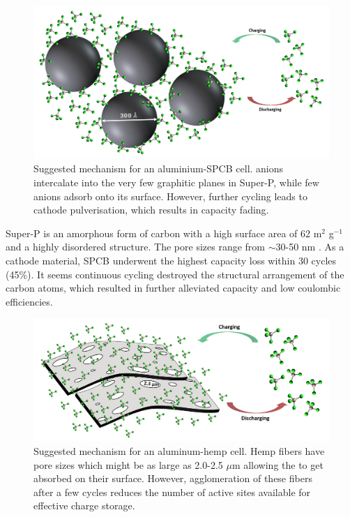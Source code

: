 \documentclass{article}
\begin{document}
 \begin{figure}[h!]
  \centering
  \includegraphics[width=\textwidth]{fig/superPmech}
    \caption{Suggested mechanism for an aluminium-SPCB cell.  anions intercalate into the very few graphitic planes in Super-P, while few anions adsorb onto its surface. However, further cycling leads to cathode pulverisation, which results in capacity fading.}
  \label{fig:superPmech}
\end{figure}

Super-P is an amorphous form of carbon with a high surface area of 62 m$^2$ g$^{-1}$ and a highly disordered structure. The pore sizes range from $\sim$30-50 nm \cite{younesi_analysis_2015}. As a cathode material, SPCB underwent the highest capacity loss within 30 cycles (45\%). It seems continuous cycling destroyed the structural arrangement of the carbon atoms, which resulted in further alleviated capacity and low coulombic efficiencies.

 \begin{figure}[h!]
  \centering
  \includegraphics[width=\textwidth]{fig/hempmech}
    \caption{Suggested mechanism for an aluminum-hemp cell. Hemp fibers have pore sizes which might be as large as 2.0-2.5 $\mu$m allowing the  to get absorbed on their surface. However, agglomeration of these fibers after a few cycles reduces the number of active sites available for effective charge storage.}
  \label{fig:hempmech}
\end{figure}
\end{document}
